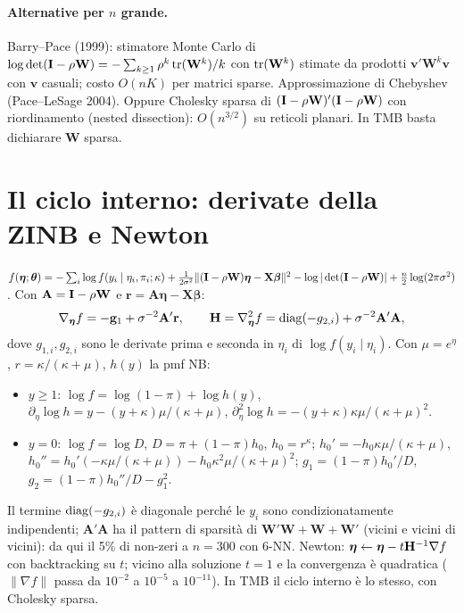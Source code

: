 \documentclass[11pt,a4paper]{article}
\newcommand{\bW}{\mathbf{W}}\newcommand{\bX}{\mathbf{X}}\newcommand{\bZ}{\mathbf{Z}}\newcommand{\by}{\mathbf{y}}
\newcommand{\beeta}{\boldsymbol{\eta}}\newcommand{\bbeta}{\boldsymbol{\beta}}\newcommand{\bgamma}{\boldsymbol{\gamma}}
\newcommand{\btheta}{\boldsymbol{\theta}}\newcommand{\bpi}{\boldsymbol{\pi}}\newcommand{\bmu}{\boldsymbol{\mu}}
\begin{document}
\paragraph{Alternative per $n$ grande.} Barry--Pace (1999): stimatore Monte Carlo di $\log\det(\bI-\rho\bW)=-\sum_{k\ge1}\rho^k\tr(\bW^k)/k$ con $\tr(\bW^k)$ stimate da prodotti $\mathbf v'\bW^k\mathbf v$ con $\mathbf v$ casuali; costo $O(nK)$ per matrici sparse. Approssimazione di Chebyshev (Pace--LeSage 2004). Oppure Cholesky sparsa di $(\bI-\rho\bW)'(\bI-\rho\bW)$ con riordinamento (nested dissection): $O(n^{3/2})$ su reticoli planari. In TMB basta dichiarare $\bW$ sparsa.

\section{Il ciclo interno: derivate della ZINB e Newton}\label{app:newton}
$f(\beeta;\btheta)=-\sum_i\log f(y_i\mid\eta_i,\pi_i;\kappa)+\tfrac1{2\sigma^2}\|(\bI-\rho\bW)\beeta-\bX\bbeta\|^2-\log|\det(\bI-\rho\bW)|+\tfrac n2\log(2\pi\sigma^2)$. Con $\mathbf A=\bI-\rho\bW$ e $\mathbf r=\mathbf A\beeta-\bX\bbeta$:
\[
\nabla_{\beeta}f=-\mathbf g_1+\sigma^{-2}\mathbf A'\mathbf r,\qquad \bH=\nabla^2_{\beeta}f=\diag(-g_{2,i})+\sigma^{-2}\mathbf A'\mathbf A,
\]
dove $g_{1,i},g_{2,i}$ sono le derivate prima e seconda in $\eta_i$ di $\log f(y_i\mid\eta_i)$. Con $\mu=e^\eta$, $r=\kappa/(\kappa+\mu)$, $h(y)$ la pmf NB:
\begin{itemize}[nosep]
\item $y\ge1$: $\log f=\log(1-\pi)+\log h(y)$, $\partial_\eta\log h=y-(y+\kappa)\mu/(\kappa+\mu)$, $\partial^2_\eta\log h=-(y+\kappa)\kappa\mu/(\kappa+\mu)^2$.
\item $y=0$: $\log f=\log D$, $D=\pi+(1-\pi)h_0$, $h_0=r^\kappa$; $h_0'=-h_0\kappa\mu/(\kappa+\mu)$, $h_0''=h_0'(-\kappa\mu/(\kappa+\mu))-h_0\kappa^2\mu/(\kappa+\mu)^2$; $g_1=(1-\pi)h_0'/D$, $g_2=(1-\pi)h_0''/D-g_1^2$.
\end{itemize}
Il termine $\operatorname{diag}(-g_{2,i})$ è diagonale perché le $y_i$ sono condizionatamente indipendenti; $\mathbf A'\mathbf A$ ha il pattern di sparsità di $\bW'\bW+\bW+\bW'$ (vicini e vicini di vicini): da qui il 5\% di non-zeri a $n=300$ con 6-NN. Newton: $\beeta\leftarrow\beeta-t\bH^{-1}\nabla f$ con backtracking su $t$; vicino alla soluzione $t=1$ e la convergenza è quadratica ($\|\nabla f\|$ passa da $10^{-2}$ a $10^{-5}$ a $10^{-11}$). In TMB il ciclo interno è lo stesso, con Cholesky sparsa.
\end{document}
